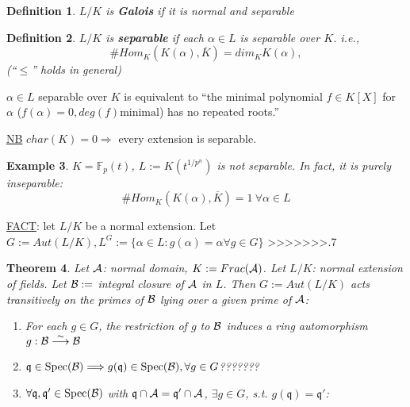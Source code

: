 \documentclass[11pt]{article}
\newtheorem{thm}{Theorem}[section]
\newtheorem{dfn}[thm]{Definition}
\newtheorem{ex}[thm]{Example}
\newcommand{\bbf}{\mathbb F}
\newcommand{\scq}{\mathfrak q}
\newcommand{\cala}{{\cal A}}
\newcommand{\calb}{{\cal B}}
\newcommand{\Lrta}{\Longrightarrow}
\newcommand{\lrta}{\longrightarrow}
\begin{document}
\begin{dfn}
$L/K$ is \textbf{Galois} if it is normal and separable
\end{dfn}

\begin{dfn}
$L/K$ is \textbf{separable} if each $\alpha\in L$ is separable over $K$. i.e.,
$$
\# Hom_K(K(\alpha),\overline{K})=dim_K K(\alpha),
$$
(``$\leq$'' holds in general)
\end{dfn}
$\alpha\in L$ separable over $K$ is equivalent to ``the minimal polynomial $f\in K[X]$ for $\alpha$ ($f(\alpha)=0, deg(f)\text{minimal}$) has no repeated roots.''

\underline{NB} $char(K)=0\Lrta$ every extension is separable.

\begin{ex}
$K=\bbf_p(t)$, $L:=K(t^{1/p^n})$ is not separable. In fact, it is purely inseparable: 
$$
\#Hom_K(K(\alpha),\overline{K})=1\ \forall \alpha\in L
$$
\end{ex}

\underline{FACT}: let $L/K$ be a normal extension. Let $G:=Aut(L/K), L^G:=\{\alpha\in L:g(\alpha)=\alpha\forall g\in G\}$
>>>>>>>.7


\begin{thm}\label{thm:normal_domain_normal_Galois}
Let $\cala$: normal domain, $K:=Frac(\cala)$.
Let $L/K$: normal extension of fields. Let $\calb:=$ integral closure of $\cala$ in $L$. Then $G:=Aut(L/K)$ acts transitively on the primes of $\calb$ lying over a given prime of $\cala$:
\begin{enumerate}[label=(\roman*)]
\item For each $g\in G$, the restriction of $g$ to $\calb$ induces a ring automorphism $g:\calb\overset{\sim}{\lrta}\calb$

\item $\scq\in \text{Spec}(\calb)\Lrta g(\scq)\in \text{Spec}(\calb), \forall g\in G$???????

\item $\forall \scq,\scq'\in \text{Spec}(\calb)$ with $\scq\cap\cala=\scq'\cap\cala$, $\exists g\in G$, s.t. $g(\scq)=\scq'$:
\end{enumerate}
\end{thm}
\end{document}
